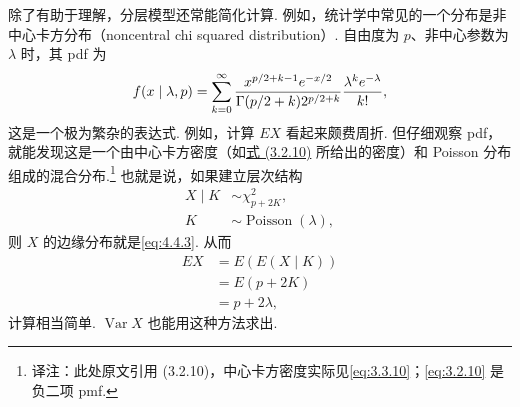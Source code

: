 除了有助于理解，分层模型还常能简化计算. 例如，统计学中常见的一个分布是非中心卡方分布（noncentral chi squared distribution）. 自由度为 $p$、非中心参数为 $\lambda$ 时，其 pdf 为
\begin{equation}\label{eq:4.4.3}\index{SI0342@卡方–泊松}\index{SI0357@非中心卡方}
f(x\mid\lambda,p)=\sum_{k=0}^{\infty}\frac{x^{p/2+k-1}e^{-x/2}}{\Gamma(p/2+k)2^{p/2+k}}\frac{\lambda^ke^{-\lambda}}{k!},
\end{equation}
这是一个极为繁杂的表达式. 例如，计算 $EX$ 看起来颇费周折. 但仔细观察 pdf，就能发现这是一个由中心卡方密度（如\hyperref[eq:3.3.10]{式 (3.2.10)} 所给出的密度）和 Poisson 分布组成的混合分布.\footnote{译注：此处原文引用 (3.2.10)，中心卡方密度实际见\eqref{eq:3.3.10}；\eqref{eq:3.2.10} 是负二项 pmf.} 也就是说，如果建立层次结构
$$\begin{aligned}X\mid K&\sim\chi^2_{p+2K},\\K&\sim\operatorname{Poisson}(\lambda),\end{aligned}$$
则 $X$ 的边缘分布就是\eqref{eq:4.4.3}. 从而
$$\begin{aligned}EX&=E(E(X\mid K))\\&=E(p+2K)\\&=p+2\lambda,\end{aligned}$$
计算相当简单. $\operatorname{Var}X$ 也能用这种方法求出.


